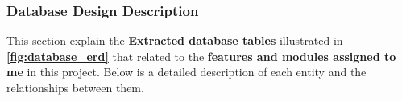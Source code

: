 \subsubsection{Database Design Description}
\noindent
\begin{minipage}{\textwidth}
    \setlength{\parindent}{2em}
    This section explain the \textbf{Extracted database tables} illustrated in \textbf{\autoref{fig:database_erd}} that related to the \textbf{features and modules assigned to me} in this project. Below is a detailed description of each entity and the relationships between them.
\end{minipage}
\vspace{-0.8em}
